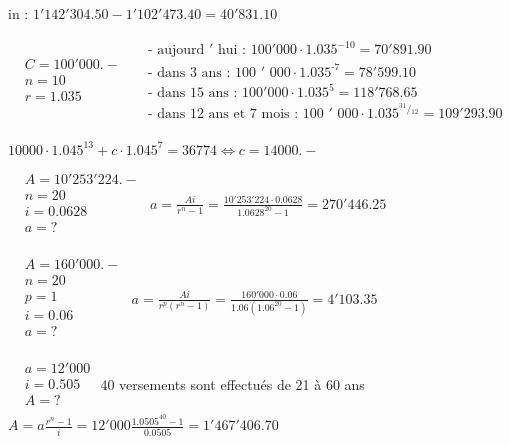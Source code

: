\begin{solution}in : $1'142'304.50-1'102'473.40=40'831.10$

$\begin{array}{ll}
  & C=100'000.- \\ 
 & n=10 \\ 
 & r=1.035 \\ 
\end{array}$
$\begin{array}{ll}
  & \text{- aujourd }\!\!'\!\!\text{ hui : }100'000\cdot {{1.035}^{-10}}=70'891.90 \\ 
 & \text{- dans 3 ans : 100 }\!\!'\!\!\text{ 000}\cdot \text{1}\text{.03}{{\text{5}}^{\text{-7}}}=78'599.10 \\ 
 & \text{- dans 15 ans : }100'000\cdot {{1.035}^{5}}=118'768.65 \\ 
 & \text{- dans 12 ans et 7 mois : 100 }\!\!'\!\!\text{ 000}\cdot \text{1}\text{.03}{{\text{5}}^{{\scriptstyle{}^{\text{31}}/{}_{\text{12}}}}}=109'293.90 \\ 
\end{array}$

$10000\cdot {{1.045}^{13}}+c\cdot {{1.045}^{7}}=36774\Leftrightarrow c=14000.-$
\end{solution}

\begin{solution}
$\begin{array}{ll}
  & A=10'253'224.- \\
  & n=20 \\ 
 & i=0.0628 \\ 
 & a=? \\ 
\end{array}$
$a=\frac{Ai}{{{r}^{n}}-1}=\frac{10'253'224\cdot 0.0628}{{{1.0628}^{20}}-1}=270'446.25$
\end{solution}

\begin{solution}
$\begin{array}{ll}
  & A=160'000.- \\ 
 & n=20 \\ 
 & p=1 \\ 
 & i=0.06 \\ 
 & a=? \\ 
\end{array}$
$a=\frac{Ai}{{{r}^{p}}\left( {{r}^{n}}-1 \right)}=\frac{160'000\cdot 0.06}{1.06\left( {{1.06}^{20}}-1 \right)}=4'103.35$
\end{solution}

\begin{solution}
$\begin{array}{ll}
  & a=12'000 \\ 
 & i=0.505 \\ 
 & A=? \\ 
\end{array} $  
40 versements sont effectués de 21 à 60 ans  $A=a\frac{{{r}^{n}}-1}{i}=12'000\frac{{{1.0505}^{40}}-1}{0.0505}=1'467'406.70$
\end{solution}

